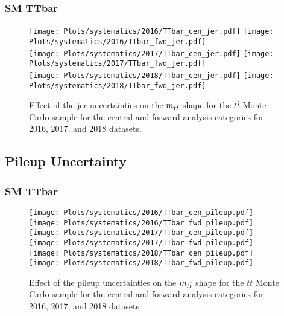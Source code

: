  
\subsubsection*{SM TTbar}

\begin{figure}[!htbp]
\begin{center}
\texttt{[image: Plots/systematics/2016/TTbar\_cen\_jer.pdf]}
\texttt{[image: Plots/systematics/2016/TTbar\_fwd\_jer.pdf]} \\
\texttt{[image: Plots/systematics/2017/TTbar\_cen\_jer.pdf]}
\texttt{[image: Plots/systematics/2017/TTbar\_fwd\_jer.pdf]} \\
\texttt{[image: Plots/systematics/2018/TTbar\_cen\_jer.pdf]}
\texttt{[image: Plots/systematics/2018/TTbar\_fwd\_jer.pdf]} \\
\caption{Effect of the jer uncertainties on the $m_{t\bar{t}}$ shape for the $t\bar{t}$ Monte Carlo sample for the central and forward analysis categories for 2016, 2017, and 2018 datasets.}
\label{fig:syst_jer_tt}
\end{center}
\end{figure}

\newpage



\subsection{Pileup Uncertainty}
 \label{sec:PILEUP_shapes}
 
 
\subsubsection*{SM TTbar}

\begin{figure}[!htbp]
\begin{center}
\texttt{[image: Plots/systematics/2016/TTbar\_cen\_pileup.pdf]}
\texttt{[image: Plots/systematics/2016/TTbar\_fwd\_pileup.pdf]} \\
\texttt{[image: Plots/systematics/2017/TTbar\_cen\_pileup.pdf]}
\texttt{[image: Plots/systematics/2017/TTbar\_fwd\_pileup.pdf]} \\
\texttt{[image: Plots/systematics/2018/TTbar\_cen\_pileup.pdf]}
\texttt{[image: Plots/systematics/2018/TTbar\_fwd\_pileup.pdf]} \\
\caption{Effect of the pileup uncertainties on the $m_{t\bar{t}}$ shape for the $t\bar{t}$ Monte Carlo sample for the central and forward analysis categories for 2016, 2017, and 2018 datasets.}
\label{fig:syst_pileup_tt}
\end{center}
\end{figure}

